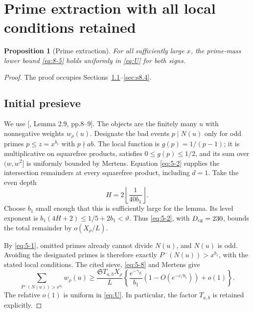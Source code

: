 \documentclass[11pt]{article}
\newtheorem{proposition}[theorem]{Proposition}
\theoremstyle{definition}
\theoremstyle{definition}
\begin{document}
\section{Prime extraction with all local conditions retained}\label{sec:s8}

\begin{proposition}[Prime extraction]\label{prop:extraction}
For all sufficiently large \(x\), the prime-mass lower bound \eqref{eq:8-5} holds uniformly in \eqref{eq:U} for both signs.
\end{proposition}
\begin{proof}
The proof occupies Sections~\ref{sec:s8.1}--\ref{sec:s8.4}.
\subsection{Initial presieve}\label{sec:s8.1}

We use [, Lemma 2.9, pp.8--9]. The objects are the finitely many \(u\) with nonnegative weights \(w_\rho(u)\). Designate the bad events \(p\mid N(u)\) only for odd primes \(p\le z=x^{b_1}\) with \(p\nmid ab\). The local function is \(g(p)=1/(p-1)\); it is multiplicative on squarefree products, satisfies \(0\le g(p)\le1/2\), and its sum over \((w,w^2]\) is uniformly bounded by Mertens. Equation \eqref{eq:5-2} supplies the intersection remainders at every squarefree product, including \(d=1\). Take the even depth
\begin{equation*}
H=2\left\lfloor\frac1{40b_1}\right\rfloor.
\end{equation*}
Choose \(b_1\) small enough that this is sufficiently large for the lemma. Its level exponent is
\(b_1(4H+2)\le1/5+2b_1<\vartheta\).
Thus \eqref{eq:5-2}, with \(D_{\rm cg}=230\), bounds the total remainder by \(o(X_\rho/L)\).

By \eqref{eq:5-1}, omitted primes already cannot divide \(N(u)\), and \(N(u)\) is odd. Avoiding the designated primes is therefore exactly \(P^-(N(u))>x^{b_1}\), with the stated local conditions. The cited sieve, \eqref{eq:5-8} and Mertens give
\begin{equation}
\sum_{P^-(N(u))>x^{b_1}}w_\rho(u)
 \ge \frac{\mathfrak S T_{a,b}X_\rho}{L}
 \left\{\frac{e^{-\gamma_E}}{b_1}
            (1-O(e^{-c/b_1}))+o(1)\right\}.             \tag{8.1}\label{eq:8-1}
\end{equation}
The relative \(o(1)\) is uniform in \eqref{eq:U}. In particular, the factor \(T_{a,b}\) is retained explicitly.


\end{proof}
\end{document}
